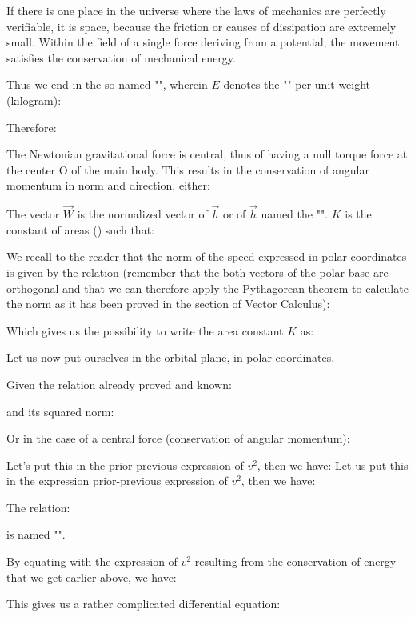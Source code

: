 	If there is one place in the universe where the laws of mechanics are perfectly verifiable, it is space, because the friction or causes of dissipation are extremely small. Within the field of a single force deriving from a potential, the movement satisfies the conservation of mechanical energy.

	Thus we end in the so-named "", wherein $E$ denotes the "" per unit weight (kilogram):
	
	Therefore:
	
	The Newtonian gravitational force is central, thus of having a null torque force at the center O of the main body. This results in the conservation of angular momentum in norm and direction, either:
	
	The vector $\vec{W}$ is the normalized vector of $\vec{b}$ or of $\vec{h}$ named the "". $K$ is the constant of areas () such that:
	
	We recall to the reader that the norm of the speed expressed in polar coordinates is given by the relation (remember that the both vectors of the polar base are orthogonal and that we can therefore apply the Pythagorean theorem to calculate the norm as it has been proved in the section of Vector Calculus):
	
	Which gives us the possibility to write the area constant $K$ as:
	
	Let us now put ourselves in the orbital plane, in polar coordinates.
	
	Given the relation already proved and known:
	
	and its squared norm:
	
	Or in the case of a central force (conservation of angular momentum):
	
	Let's put this in the prior-previous expression of $v^2$, then we have:
	Let us put this in the expression prior-previous expression of $v^2$, then we have:
	
	The relation:
	
	is named "".
	
	By equating with the expression of $v^2$ resulting from the conservation of energy that we get earlier above, we have:
	
	This gives us a rather complicated differential equation:
	
